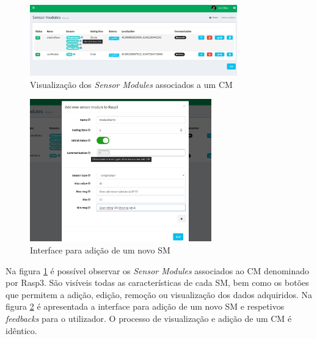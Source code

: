 \newpage



\begin{figure}[h]
	\centering

		\includegraphics[width=0.8\textwidth]{prints-web/sm_show.png}
		\caption{Visualização dos \textit{Sensor Modules} associados a um \acl{CM} }
		\label{view-sm}

\end{figure}


\begin{figure}[h]
		\centering
		\includegraphics[width=0.7\textwidth]{prints-web/sm_add.png}
		\caption{Interface para adição de um novo \acl{SM} }
		\label{add-sm}

\end{figure}



Na figura \ref{view-sm} é possível observar os \textit{Sensor Modules} associados ao \acl{CM} denominado por Rasp3. São visíveis todas as características de cada \acl{SM}, bem como os botões que permitem a adição, edição, remoção ou visualização dos dados adquiridos. Na figura \ref{add-sm} é apresentada a interface para adição de um novo \acl{SM} e respetivos \textit{feedbacks} para o utilizador. O processo de visualização e adição de um \acl{CM} é idêntico. 


\newpage



